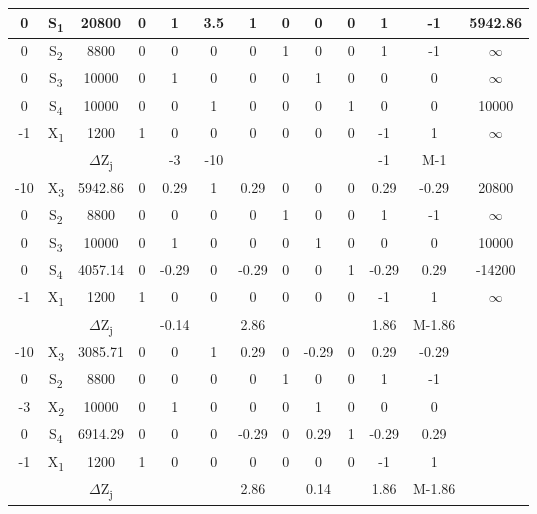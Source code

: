 \begin{table}[htp]
{\begin{tabular}{|c||c||c||c|c|c|c|c|c|c|c|c||c|}
	0       & S\textsubscript{1} & 20800					  & 0      & 1      & 3.5   & 1     & 0     & 0     & 0     & 1		& -1	 & 5942.86  \\ \hline
	0       & S\textsubscript{2} & 8800 					  & 0	   & 0      & 0     & 0     & 1     & 0     & 0     & 1		& -1	 & $\infty$ \\ \hline
	0       & S\textsubscript{3} & 10000 					  & 0      & 1      & 0     & 0     & 0     & 1     & 0     & 0		& 0		 & $\infty$	\\ \hline
	0       & S\textsubscript{4} & 10000   					  & 0      & 0      & 1     & 0     & 0     & 0     & 1     & 0		& 0		 & 10000	\\ \hline
	-1      & X\textsubscript{1} & 1200   					  & 1      & 0      & 0     & 0     & 0     & 0     & 0     & -1	& 1		 & $\infty$	\\ \hline
			&    				 & $\Delta$Z\textsubscript{j} & 	   & -3	    & -10	&       &       &       &       & -1    & M-1	 &		   	\\ \hline\hline
 
	-10     & X\textsubscript{3} & 5942.86					  & 0      & 0.29   & 1   	& 0.29  & 0     & 0     & 0     & 0.29	& -0.29	 & 20800  	\\ \hline
	0       & S\textsubscript{2} & 8800 					  & 0	   & 0      & 0     & 0     & 1     & 0     & 0     & 1		& -1	 & $\infty$ \\ \hline
	0       & S\textsubscript{3} & 10000 					  & 0      & 1      & 0     & 0     & 0     & 1     & 0     & 0		& 0		 & 10000	\\ \hline
	0       & S\textsubscript{4} & 4057.14 					  & 0      & -0.29  & 0     & -0.29 & 0     & 0     & 1     & -0.29	& 0.29	 & -14200	\\ \hline
	-1      & X\textsubscript{1} & 1200   					  & 1      & 0      & 0     & 0     & 0     & 0     & 0     & -1	& 1		 & $\infty$	\\ \hline
			&    				 & $\Delta$Z\textsubscript{j} & 	   & -0.14  & 		& 2.86	&       &       &       & 1.86  & M-1.86 &		   	\\ \hline\hline

	-10     & X\textsubscript{3} & 3085.71					  & 0      & 0	   	& 1   	& 0.29  & 0     & -0.29 & 0     & 0.29	& -0.29	 & 			\\ \hline
	0       & S\textsubscript{2} & 8800 					  & 0	   & 0      & 0     & 0     & 1     & 0     & 0     & 1		& -1	 & 			\\ \hline
	-3      & X\textsubscript{2} & 10000 					  & 0      & 1      & 0     & 0     & 0     & 1     & 0     & 0		& 0		 & 			\\ \hline
	0       & S\textsubscript{4} & 6914.29 					  & 0      & 0	  	& 0     & -0.29 & 0     & 0.29  & 1     & -0.29	& 0.29	 & 			\\ \hline
	-1      & X\textsubscript{1} & 1200   					  & 1      & 0      & 0     & 0     & 0     & 0     & 0     & -1	& 1		 & 			\\ \hline
			&    				 & $\Delta$Z\textsubscript{j} & 	   & 		& 		& 2.86	&       & 0.14  &       & 1.86  & M-1.86 &		   	\\ \hline
	\end{tabular} 
	}
	\label{tab:q1}
\end{table}